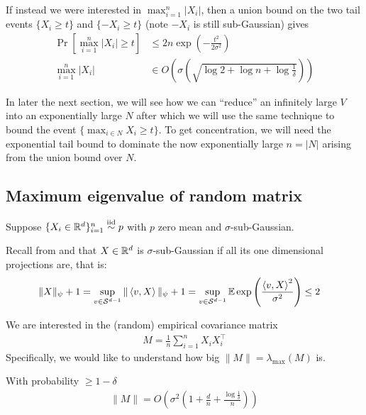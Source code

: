 If instead we were interested in $\max_{i=1}^n \lvert X_i \rvert$, then a union bound on the two
tail events $\{X_i \geq t\}$ and $\{-X_i \geq t\}$ (note $-X_i$ is still sub-Gaussian) gives
\begin{align}
    \Pr\left[\max_{i=1}^n \lvert X_i \rvert \geq t\right] &\leq 2 n \exp\left( -\frac{t^2}{2 \sigma^2} \right)
    \label{eq:tail-bound-abs-value-two-factor}\\
    \max_{i=1}^n \lvert X_i \rvert &\in O\left( \sigma \left(\sqrt{\log 2 + \log n + \log \frac{1}{\delta}}\right) \right)
\end{align}

In later the next section, we will see how we can ``reduce'' an infinitely large $V$
into an exponentially large $N$ after which
we will use the same technique to bound the event $\{ \max_{i \in N} X_i \geq t \}$.
To get concentration, we will need the exponential tail bound to dominate the now exponentially large $n = \lvert N \rvert$
arising from the union bound over $N$.

\subsection{Maximum eigenvalue of random matrix}

Suppose $\{X_i \in \mathbb{R}^d \}_{i=1}^n \overset{\text{iid}}{\sim} p$ with $p$ zero mean and $\sigma$-sub-Gaussian.

Recall from  and 
that $X \in \mathbb{R}^d$ is $\sigma$-sub-Gaussian if all its one dimensional projections are, that is:
\begin{align}
    \|X\|_\psi + 1
    &= \sup_{v \in \mathcal{S}^{d-1}} \|\braket{v,X}\|_\psi + 1
    = \sup_{v \in \mathcal{S}^{d-1}} \mathbb{E} \exp\left(\frac{\braket{v, X}^2}{\sigma^2} \right)
    \leq 2\label{eq:9-10-recap-multivar-sub-gaussian}
\end{align}

We are interested in the (random) empirical covariance matrix
\begin{align}
    M = \frac{1}{n} \sum_{i=1}^n X_i X_i^\top
\end{align}
Specifically, we would like to understand how big $\|M\| = \lambda_{\max}(M)$ is.

\begin{proposition}\label{prop:9-10-cov-operator-norm}
    With probability $\geq 1 - \delta$
    \begin{align}
        \|M\| = O\left(\sigma^2 \left( 1 + \frac{d}{n} + \frac{\log \frac{1}{\delta}}{n} \right) \right)
    \end{align}
\end{proposition}

